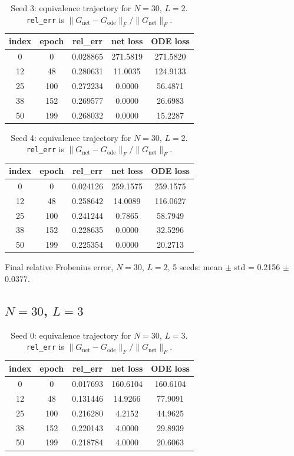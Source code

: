 \begin{table}[H]
\centering
\caption{Seed 3: equivalence trajectory for $N=30$, $L=2$. \texttt{rel\_err} is $\|G_{\mathrm{net}} - G_{\mathrm{ode}}\|_F / \|G_{\mathrm{net}}\|_F$.}
\label{tab:equiv-N30-L2-s3}
\begin{tabular}{c c c c c}
\toprule
index & epoch & rel\_err & net loss & ODE loss \\
\midrule
0 & 0 & 0.028865 & 271.5819 & 271.5820 \\
12 & 48 & 0.280631 & 11.0035 & 124.9133 \\
25 & 100 & 0.272234 & 0.0000 & 56.4871 \\
38 & 152 & 0.269577 & 0.0000 & 26.6983 \\
50 & 199 & 0.268032 & 0.0000 & 15.2287 \\
\bottomrule
\end{tabular}
\end{table}

\begin{table}[H]
\centering
\caption{Seed 4: equivalence trajectory for $N=30$, $L=2$. \texttt{rel\_err} is $\|G_{\mathrm{net}} - G_{\mathrm{ode}}\|_F / \|G_{\mathrm{net}}\|_F$.}
\label{tab:equiv-N30-L2-s4}
\begin{tabular}{c c c c c}
\toprule
index & epoch & rel\_err & net loss & ODE loss \\
\midrule
0 & 0 & 0.024126 & 259.1575 & 259.1575 \\
12 & 48 & 0.258642 & 14.0089 & 116.0627 \\
25 & 100 & 0.241244 & 0.7865 & 58.7949 \\
38 & 152 & 0.228635 & 0.0000 & 32.5296 \\
50 & 199 & 0.225354 & 0.0000 & 20.2713 \\
\bottomrule
\end{tabular}
\end{table}

Final relative Frobenius error, $N=30$, $L=2$, 5 seeds: mean $\pm$ std = 0.2156 $\pm$ 0.0377.

\subsection{$N=30$, $L=3$}
\begin{table}[H]
\centering
\caption{Seed 0: equivalence trajectory for $N=30$, $L=3$. \texttt{rel\_err} is $\|G_{\mathrm{net}} - G_{\mathrm{ode}}\|_F / \|G_{\mathrm{net}}\|_F$.}
\label{tab:equiv-N30-L3-s0}
\begin{tabular}{c c c c c}
\toprule
index & epoch & rel\_err & net loss & ODE loss \\
\midrule
0 & 0 & 0.017693 & 160.6104 & 160.6104 \\
12 & 48 & 0.131446 & 14.9266 & 77.9091 \\
25 & 100 & 0.216280 & 4.2152 & 44.9625 \\
38 & 152 & 0.220143 & 4.0000 & 29.8939 \\
50 & 199 & 0.218784 & 4.0000 & 20.6063 \\
\bottomrule
\end{tabular}
\end{table}

